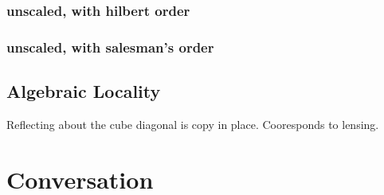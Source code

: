 \documentclass[letterpaper,twocolumn,amsmath,amsfont,amssymb,english,aps,jcp,preprintnumbers,groupaddress,nofootinbib,tightenlines]{revtex4}
\begin{document}
\subsubsection{unscaled, with hilbert order}

\subsubsection{unscaled, with salesman's order}

\subsection{Algebraic  Locality} 

Reflecting about the cube diagonal is copy in place.  Cooresponds to lensing. 


\section{Conversation}



\end{document}
